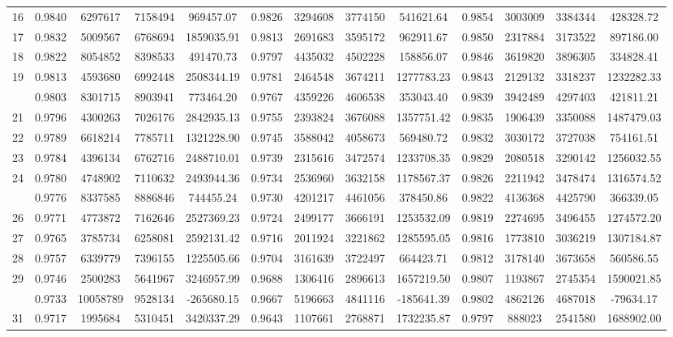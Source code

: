 \documentclass[
  12pt,
]{article}
\begin{document}
\begin{longtable}[t]{lcccccccccccc}
16 & 0.9840 & 6297617 & 7158494 & 969457.07 & 0.9826 & 3294608 & 3774150 & 541621.64 & 0.9854 & 3003009 & 3384344 & 428328.72\\
17 & 0.9832 & 5009567 & 6768694 & 1859035.91 & 0.9813 & 2691683 & 3595172 & 962911.67 & 0.9850 & 2317884 & 3173522 & 897186.00\\
18 & 0.9822 & 8054852 & 8398533 & 491470.73 & 0.9797 & 4435032 & 4502228 & 158856.07 & 0.9846 & 3619820 & 3896305 & 334828.41\\
19 & 0.9813 & 4593680 & 6992448 & 2508344.19 & 0.9781 & 2464548 & 3674211 & 1277783.23 & 0.9843 & 2129132 & 3318237 & 1232282.33\\
\addlinespace
20 & 0.9803 & 8301715 & 8903941 & 773464.20 & 0.9767 & 4359226 & 4606538 & 353043.40 & 0.9839 & 3942489 & 4297403 & 421811.21\\
21 & 0.9796 & 4300263 & 7026176 & 2842935.13 & 0.9755 & 2393824 & 3676088 & 1357751.42 & 0.9835 & 1906439 & 3350088 & 1487479.03\\
22 & 0.9789 & 6618214 & 7785711 & 1321228.90 & 0.9745 & 3588042 & 4058673 & 569480.72 & 0.9832 & 3030172 & 3727038 & 754161.51\\
23 & 0.9784 & 4396134 & 6762716 & 2488710.01 & 0.9739 & 2315616 & 3472574 & 1233708.35 & 0.9829 & 2080518 & 3290142 & 1256032.55\\
24 & 0.9780 & 4748902 & 7110632 & 2493944.36 & 0.9734 & 2536960 & 3632158 & 1178567.37 & 0.9826 & 2211942 & 3478474 & 1316574.52\\
\addlinespace
25 & 0.9776 & 8337585 & 8886846 & 744455.24 & 0.9730 & 4201217 & 4461056 & 378450.86 & 0.9822 & 4136368 & 4425790 & 366339.05\\
26 & 0.9771 & 4773872 & 7162646 & 2527369.23 & 0.9724 & 2499177 & 3666191 & 1253532.09 & 0.9819 & 2274695 & 3496455 & 1274572.20\\
27 & 0.9765 & 3785734 & 6258081 & 2592131.42 & 0.9716 & 2011924 & 3221862 & 1285595.05 & 0.9816 & 1773810 & 3036219 & 1307184.87\\
28 & 0.9757 & 6339779 & 7396155 & 1225505.66 & 0.9704 & 3161639 & 3722497 & 664423.71 & 0.9812 & 3178140 & 3673658 & 560586.55\\
29 & 0.9746 & 2500283 & 5641967 & 3246957.99 & 0.9688 & 1306416 & 2896613 & 1657219.50 & 0.9807 & 1193867 & 2745354 & 1590021.85\\
\addlinespace
30 & 0.9733 & 10058789 & 9528134 & -265680.15 & 0.9667 & 5196663 & 4841116 & -185641.39 & 0.9802 & 4862126 & 4687018 & -79634.17\\
31 & 0.9717 & 1995684 & 5310451 & 3420337.29 & 0.9643 & 1107661 & 2768871 & 1732235.87 & 0.9797 & 888023 & 2541580 & 1688902.00\\

\end{longtable}
\end{document}

